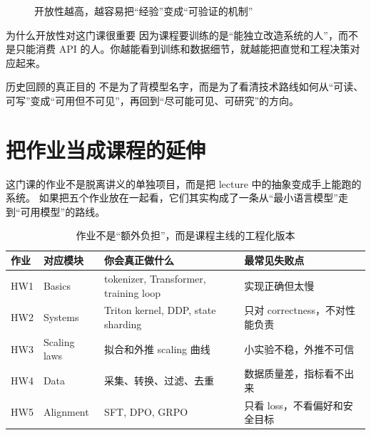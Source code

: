 \documentclass[a4paper]{article}
\begin{document}
\begin{figure}[H]
\centering
{}
\caption{开放性越高，越容易把“经验”变成“可验证的机制”}
\end{figure}

\begin{knowledgebox}{为什么开放性对这门课很重要}
因为课程要训练的是“能独立改造系统的人”，而不是只能消费 API 的人。你越能看到训练和数据细节，就越能把直觉和工程决策对应起来。
\end{knowledgebox}

\begin{importantbox}{历史回顾的真正目的}
不是为了背模型名字，而是为了看清技术路线如何从“可读、可写”变成“可用但不可见”，再回到“尽可能可见、可研究”的方向。
\end{importantbox}

\section{把作业当成课程的延伸}

这门课的作业不是脱离讲义的单独项目，而是把 lecture 中的抽象变成手上能跑的系统。
如果把五个作业放在一起看，它们其实构成了一条从“最小语言模型”走到“可用模型”的路线。

\begin{table}[H]
\centering
\begin{tabular}{p{2.1cm}p{3.1cm}p{4.3cm}p{3.5cm}}
\toprule
\textbf{作业} & \textbf{对应模块} & \textbf{你会真正做什么} & \textbf{最常见失败点} \\
\midrule
HW1 & Basics & tokenizer, Transformer, training loop & 实现正确但太慢 \\
HW2 & Systems & Triton kernel, DDP, state sharding & 只对 correctness，不对性能负责 \\
HW3 & Scaling laws & 拟合和外推 scaling 曲线 & 小实验不稳，外推不可信 \\
HW4 & Data & 采集、转换、过滤、去重 & 数据质量差，指标看不出来 \\
HW5 & Alignment & SFT, DPO, GRPO & 只看 loss，不看偏好和安全目标 \\
\bottomrule
\end{tabular}
\caption{作业不是“额外负担”，而是课程主线的工程化版本}
\end{table}
\end{document}
